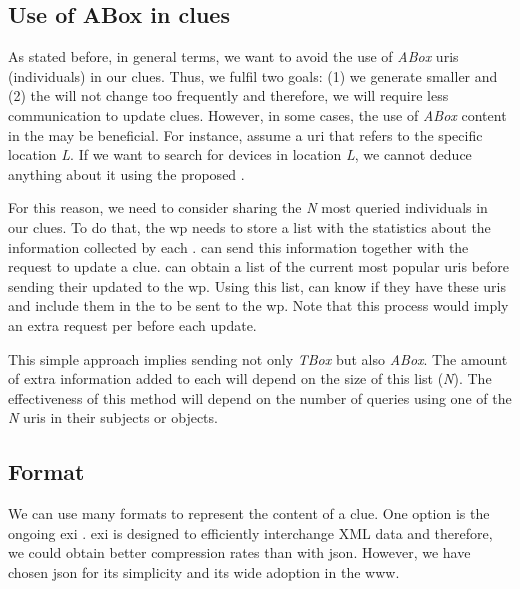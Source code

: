 \subsection{Use of ABox in clues}
\label{sec:aboxinclues}
As stated before, in general terms, we want to avoid the use of \emph{ABox} \acp{uri} (individuals) in our clues.
Thus, we fulfil two goals:
(1) we generate smaller \clues{} and
(2) the \clues{} will not change too frequently and therefore, we will require less communication to update clues.
However, in some cases, the use of \emph{ABox} content in the \clues{} may be beneficial.
For instance, assume a \ac{uri} that refers to the specific location \emph{L}.
If we want to search for devices in location \emph{L}, we cannot deduce anything about it using the proposed \clues{}.

For this reason, we need to consider sharing the \emph{N} most queried individuals in our clues.
To do that, the \ac{wp} needs to store a list with the statistics about the information collected by each \consumer{}.
\consumers{} can send this information together with the request to update a clue.
\providers{} can obtain a list of the current most popular \acp{uri} before sending their updated \clues{} to the \ac{wp}.
Using this list, \providers{} can know if they have these \acp{uri} and include them in the \clue{} to be sent to the \ac{wp}.
Note that this process would imply an extra request per \provider{} before each update.

This simple approach implies sending not only \emph{TBox} but also \emph{ABox}.
The amount of extra information added to each \clue{} will depend on the size of this list (\emph{N}).
The effectiveness of this method will depend on the number of queries using one of the \emph{N} \acp{uri} in their subjects or objects.


\subsection{Format}
We can use many formats to represent the content of a clue.
One option is the ongoing \acf{exi} . %
\ac{exi} is designed to efficiently interchange XML data and therefore, we could obtain better compression rates than with \ac{json}. %
However, we have chosen \ac{json} for its simplicity and its wide adoption in the \ac{www}.

